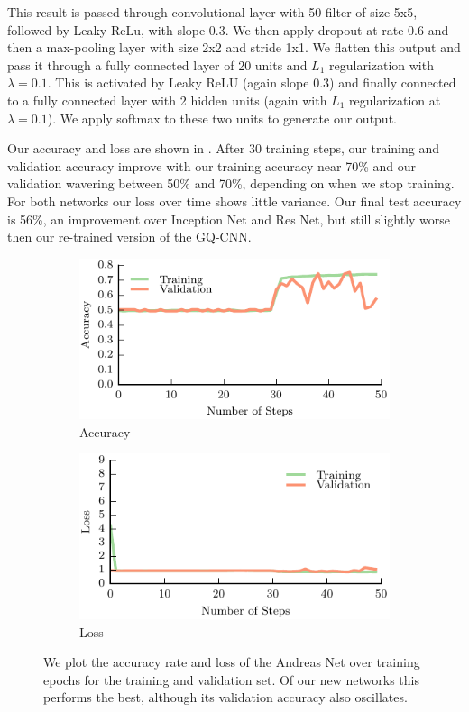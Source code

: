 This result is passed through convolutional layer with 50 filter of size 5x5, followed by Leaky ReLu, with slope 0.3. 
We then apply dropout at rate 0.6 and then a max-pooling layer with size 2x2 and stride 1x1. 
We flatten this output and pass it through a fully connected layer of 20 units and $L_{1}$ regularization with $\lambda = 0.1$. 
This is activated by Leaky ReLU (again slope 0.3) and finally connected to a fully connected layer with 2 hidden units (again with $L_{1}$ regularization at $\lambda=0.1$). 
We apply softmax to these two units to generate our output. 

Our accuracy and loss are shown in . 
After 30 training steps, our training and validation accuracy improve with our training accuracy near 70\% and our validation wavering between 50\% and 70\%, depending on when we stop training. 
For both networks our loss over time shows little variance. 
Our final test accuracy is 56\%, an improvement over Inception Net and Res Net, but still slightly worse then our re-trained version of the GQ-CNN. 

\begin{figure}[t!]
    \centering
    \begin{subfigure}[t]{0.49\textwidth}
        \includegraphics[width=0.9\columnwidth]{figs/andreas_accuracy.pdf}
        \caption{Accuracy} \label{fig:accuracy}
        \end{subfigure}
    \begin{subfigure}[t]{0.49\textwidth}
        \includegraphics[width=0.9\columnwidth]{figs/andreas_loss.pdf}
        \caption{Loss} \label{fig:loss}
    \end{subfigure}
\caption{We plot the accuracy rate and loss of the Andreas Net over training epochs for the training and validation set. Of our new networks this performs the best, although its validation accuracy also oscillates.} \label{fig:andreas_results}
\end{figure}